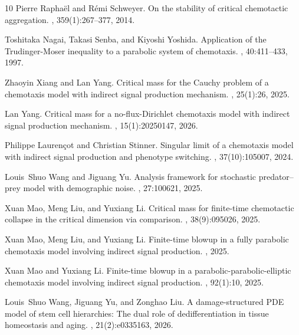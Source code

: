 \documentclass[11pt,reqno]{amsart}
\theoremstyle{definition}
\theoremstyle{remark}
\begin{document}
\begin{thebibliography}{10}
Pierre Rapha{\"e}l and R{\'e}mi Schweyer.
\newblock On the stability of critical chemotactic aggregation.
, 359(1):267--377, 2014.

Toshitaka Nagai, Takasi Senba, and Kiyoshi Yoshida.
\newblock Application of the {T}rudinger-{M}oser inequality to a parabolic system of chemotaxis.
, 40:411--433, 1997.

Zhaoyin Xiang and Lan Yang.
\newblock Critical mass for the {C}auchy problem of a chemotaxis model with indirect signal production mechanism.
, 25(1):26, 2025.

Lan Yang.
\newblock Critical mass for a no-flux-{D}irichlet chemotaxis model with indirect signal production mechanism.
, 15(1):20250147, 2026.

Philippe Lauren{\c{c}}ot and Christian Stinner.
\newblock Singular limit of a chemotaxis model with indirect signal production and phenotype switching.
, 37(10):105007, 2024.

Louis~Shuo Wang and Jiguang Yu.
\newblock Analysis framework for stochastic predator--prey model with demographic noise.
, 27:100621, 2025.

Xuan Mao, Meng Liu, and Yuxiang Li.
\newblock Critical mass for finite-time chemotactic collapse in the critical dimension via comparison.
, 38(9):095026, 2025.

Xuan Mao, Meng Liu, and Yuxiang Li.
\newblock Finite-time blowup in a fully parabolic chemotaxis model involving indirect signal production.
, 2025.

Xuan Mao and Yuxiang Li.
\newblock Finite-time blowup in a parabolic-parabolic-elliptic chemotaxis model involving indirect signal production.
, 92(1):10, 2025.

Louis~Shuo Wang, Jiguang Yu, and Zonghao Liu.
\newblock A damage-structured {P}{D}{E} model of stem cell hierarchies: The dual role of dedifferentiation in tissue homeostasis and aging.
, 21(2):e0335163, 2026.


\end{thebibliography}
\end{document}
